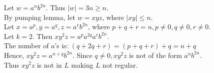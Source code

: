 \begin{solution}
\begin{enumerate}
        Let $w = a^nb^{2n}$. Thus $|w| = 3n \geq n$.\\
        By pumping lemma, let $w=xyz$, where $|xy|\leq n$.\\
        Let $x=a^p,y=a^q,z=a^rb^{2n}$, where $p+q+r=n,p\neq 0,q\neq 0, r\neq 0$.\\
        Let $k=2$. Then $xy^2z=a^pa^{2q}a^rb^{2n}$.\\
        The number of $a$'s is: $\left( q+2q+r \right)=\left( p+q+r \right)+q = n+q$\\
        Hence, $xy^2z=a^{n+q}b^{2n}$. Since $q\neq 0, xy^2z$ is not of the form $a^nb^{2n}$.\\
        Thus $xy^2z$ is not in $L$ making $L$ not regular.
    \end{enumerate}
\end{solution}

